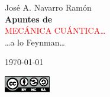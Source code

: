 %


\newcommand*{\titleTH}{\begingroup%
\raggedleft
\vspace*{\baselineskip}
{\Large José A. Navarro Ramón}\\[0.167\textheight]
{\bfseries Apuntes de}\\[\baselineskip]
{\textcolor{red}{\Huge MECÁNICA CUÁNTICA\dots}}\\[\baselineskip]
{\dots a lo Feynman\dots}\par
\vspace{2ex}
\today\par
\vspace{20ex}
{\Large \includegraphics[width=2.0cm]{./img/static/Cc-by-nc-sa_icon.eps}}\par
\vspace*{3\baselineskip}
\endgroup}

\titleTH




